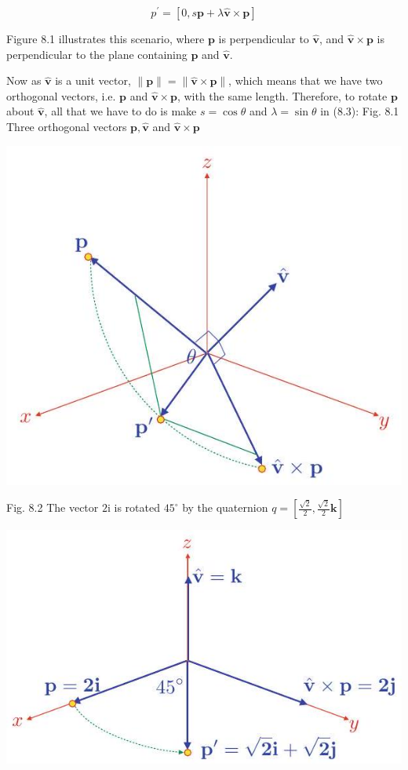 \documentclass[10pt]{article}
\begin{document}
$$
p^{\prime}=[0, s \mathbf{p}+\lambda \hat{\mathbf{v}} \times \mathbf{p}]
$$

Figure 8.1 illustrates this scenario, where $\mathbf{p}$ is perpendicular to $\hat{\mathbf{v}}$, and $\hat{\mathbf{v}} \times \mathbf{p}$ is perpendicular to the plane containing $\mathbf{p}$ and $\hat{\mathbf{v}}$.

Now as $\hat{\mathbf{v}}$ is a unit vector, $\|\mathbf{p}\|=\|\hat{\mathbf{v}} \times \mathbf{p}\|$, which means that we have two orthogonal vectors, i.e. $\mathbf{p}$ and $\hat{\mathbf{v}} \times \mathbf{p}$, with the same length. Therefore, to rotate $\mathbf{p}$ about $\hat{\mathbf{v}}$, all that we have to do is make $s=\cos \theta$ and $\lambda=\sin \theta$ in (8.3): Fig. 8.1 Three orthogonal vectors $\mathbf{p}, \hat{\mathbf{v}}$ and $\hat{\mathbf{v}} \times \mathbf{p}$

\begin{center}
\includegraphics[max width=\textwidth]{2023_04_20_41f1ceac5a31dc7d1b59g-141}
\end{center}

Fig. 8.2 The vector $2 \mathrm{i}$ is rotated $45^{\circ}$ by the quaternion $q=\left[\frac{\sqrt{2}}{2}, \frac{\sqrt{2}}{2} \mathbf{k}\right]$

\begin{center}
\includegraphics[max width=\textwidth]{2023_04_20_41f1ceac5a31dc7d1b59g-141(1)}
\end{center}
\end{document}
